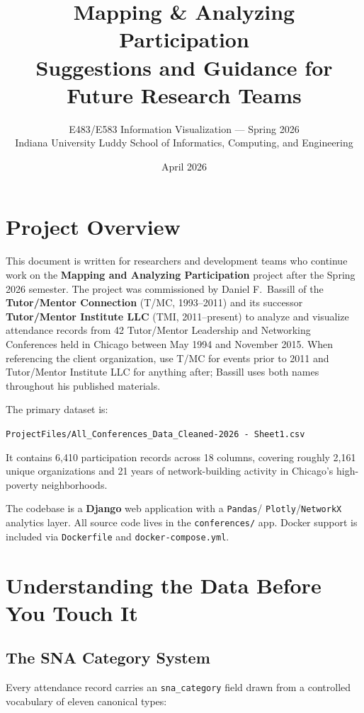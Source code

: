 \documentclass[12pt]{article}
\title{\textbf{Mapping \& Analyzing Participation}\\
\large Suggestions and Guidance for Future Research Teams}
\author{E483/E583 Information Visualization --- Spring 2026\\
Indiana University Luddy School of Informatics, Computing, and Engineering}
\date{April 2026}
\begin{document}
\maketitle
\tableofcontents
\newpage

\section{Project Overview}

This document is written for researchers and development teams who continue
work on the \textbf{Mapping and Analyzing Participation} project after the
Spring 2026 semester. The project was commissioned by Daniel F.~Bassill of the
\textbf{Tutor/Mentor Connection} (T/MC, 1993--2011) and its successor
\textbf{Tutor/Mentor Institute LLC} (TMI, 2011--present) to analyze and
visualize attendance records from 42 Tutor/Mentor Leadership and Networking
Conferences held in Chicago between May 1994 and November 2015.
When referencing the client organization, use T/MC for events prior to 2011
and Tutor/Mentor Institute LLC for anything after; Bassill uses both names
throughout his published materials.

The primary dataset is:
\begin{center}
\texttt{ProjectFiles/All\_Conferences\_Data\_Cleaned-2026 - Sheet1.csv}
\end{center}
It contains 6,410 participation records across 18 columns, covering roughly
2,161 unique organizations and 21 years of network-building activity in
Chicago's high-poverty neighborhoods.

The codebase is a \textbf{Django} web application with a \texttt{Pandas}/
\texttt{Plotly}/\texttt{NetworkX} analytics layer. All source code lives
in the \texttt{conferences/} app. Docker support is included via
\texttt{Dockerfile} and \texttt{docker-compose.yml}.

\section{Understanding the Data Before You Touch It}

\subsection{The SNA Category System}

Every attendance record carries an \texttt{sna\_category} field drawn from a
controlled vocabulary of eleven canonical types:
\end{document}
